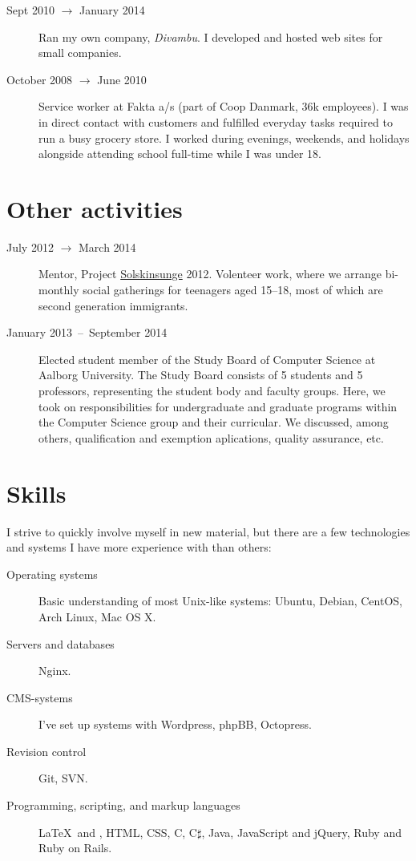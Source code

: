 \documentclass[margin,line]{resume}
\begin{document}
\begin{resume}
\begin{description}
  \item[Sept 2010 $\rightarrow$ January 2014] Ran my own company,
  \emph{Divambu}. I developed and hosted web sites for small companies.

  \item[October 2008 $\rightarrow$ June 2010] Service worker at Fakta
  a/s (part of Coop Danmark, 36k employees). I was in direct contact
  with customers and fulfilled everyday tasks required to run a busy
  grocery store. I worked during evenings, weekends, and holidays
  alongside attending school full-time while I was under 18.
\end{description}

\section{\mysidestyle{} Other activities}\vspace{1mm}
\begin{description}
  \item[July 2012 $\rightarrow$ March 2014] Mentor, Project
    \href{http://www.urk.dk/solskinsunge/}{Solskinsunge} 2012. Volenteer
    work, where we arrange bi-monthly social gatherings for teenagers aged
    15--18, most of which are second generation immigrants.

  \item[January 2013~--~September 2014] Elected student member of the
  Study Board of Computer Science at Aalborg University. The Study Board
  consists of 5 students and 5 professors, representing the student body
  and faculty groups. Here, we took on responsibilities
  for undergraduate and graduate programs within the Computer Science
  group and their curricular. We discussed, among others, qualification
  and exemption aplications, quality assurance, etc.
\end{description}

\section{\mysidestyle{} Skills} \vspace{1mm}
I strive to quickly involve myself in new material, but there are a few
technologies and systems I have more experience with than others:
\vspace{0.5cm}
\begin{description}
  \item[Operating systems] Basic understanding of most Unix-like
    systems: Ubuntu, Debian, CentOS, Arch Linux, Mac OS X.
  \item[Servers and databases] Nginx. 
  \item[CMS-systems] I've set up systems with Wordpress, phpBB,
    Octopress.
  \item[Revision control] Git, SVN\@.
  \item[Programming, scripting, and markup languages] \LaTeX\ and
    \XeTeX, HTML, CSS, C, C$\sharp$, Java, JavaScript and jQuery, Ruby
    and Ruby on Rails.
\end{description}


\end{resume}
\end{document}
